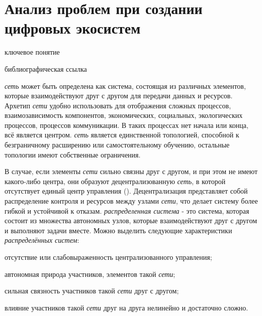 \section{Анализ проблем при создании цифровых экосистем}
{\label{sec_ecosystem_analysis}} 

\begin{SCn}

\begin{scnrelfromlist}{ключевое понятие}
\end{scnrelfromlist}


\begin{scnrelfromlist}{библиографическая ссылка}
\end{scnrelfromlist}

\end{SCn}    

\textit{сеть} может быть определена как система, состоящая из различных элементов, которые взаимодействуют друг с другом для передачи данных и ресурсов. Архетип \textit{сети} удобно использовать для отображения сложных процессов, взаимозависимость компонентов, экономических, социальных, экологических процессов, процессов коммуникации. В таких процессах нет начала или конца, всё является центром. \textit{сеть} является единственной топологией, способной к безграничному расширению или самостоятельному обучению, остальные топологии имеют собственные ограничения.

В случае, если элементы \textit{сети} сильно связны друг с другом, и при этом не имеют какого-либо центра, они образуют децентрализованную \textit{сеть}, в которой отсутствует единый центр управления (). Децентрализация представляет собой распределение контроля и ресурсов между узлами \textit{сети}, что делает систему более гибкой и устойчивой к отказам. \textit{распределенная система} - это система, которая состоит из множества автономных узлов, которые взаимодействуют друг с другом и выполняют задачи вместе.
Можно выделить следующие характеристики \textit{распределённых систем}:
\begin{textitemize}
    \item отсутствие или слабовыраженность централизованного управления;
    \item автономная природа участников, элементов такой \textit{сети};
    \item сильная связность участников такой \textit{сети} друг с другом;
    \item влияние участников такой \textit{сети} друг на друга нелинейно и достаточно сложно.
\end{textitemize}

